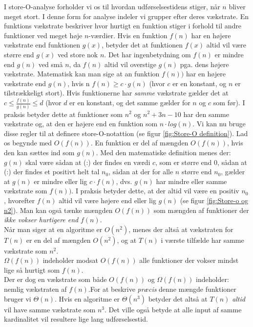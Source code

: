I store-O-analyse forholder vi os til hvordan udførselsestidens stiger, når $n$ bliver meget stort. I denne form for analyse indeler vi grupper efter deres vækstrate. En funktions vækstrate beskriver hvor hurtigt en funktion stiger i forhold til andre funktioner ved meget høje $n$-værdier. Hvis en funktion $f(n)$ har en højere vækstrate end funktionen $g(x)$, betyder det at funktionen $f(x)$ altid vil være større end $g(x)$ ved store nok $n$. Det har ingenbetydning om $f(n)$ er mindre end $g(n)$ ved små $n$, da $f(n)$ altid vil overstige $g(n)$ pga. dens højere vækstrate. Matematisk kan man sige at an funktion $f(n))$ har en højere vækstrate end $g(n)$, hvis n $f(n) \geq c \cdot g(n)$  (hvor $c$ er en konstant, og $n$ er tilstrækkeligt stort). Hvis funktionerne har \emph{samme} vækstrate gælder det at $c \leq \frac{f(n)}{g(n)} \leq d$ (hvor $d$ er en konstant, og det samme gælder for $n$ og $c$ som før). I praksis betyder dette at funktioner som $n^2$ og $n^2+3n-10$ har den samme vækstrate og, at den er højere end en funktion som $n \cdot log(n)$. Vi kan nu bruge disse regler til at definere store-O-notattion (se figur \ref{fig:Store-O definition}). Lad os begynde med $O(f(n))$. En funktion er del af mængden $O(f(n))$, hvis den kan sættes ind som $g(n)$. Med den matematiske definition menes der: $g(n)$ skal være sådan at (:) der findes en værdi $c$, som er større end $0$, sådan at (:) der findes et positivt helt tal $n_0$, sådan at der for alle $n$ større end $n_0$, gælder at $g(n)$ er mindre eller lig $c \cdot f(n)$, dvs. $g(n)$ har mindre eller samme vækstrate som $f(n))$. I praksis betyder dette, at der altid vil være en positiv $n_0$, hvorefter $f(n)$ altid vil være højere end eller lig $g(n)$ (se figur \ref{fig:Store-o og n2}). Man kan også tænke mængden $O(f(n))$ som mængden af funktioner der \emph{ikke vokser hurtigere end} $f(n)$.\\

Når man siger at en algoritme er $O(n^2)$, menes der altså at vækstraten for $T(n)$ er en del af mængden $O(n^2)$, og at $T(n)$ i værste tilfælde har samme vækstrate som $n^2$.\\

$\Omega (f(n))$ indeholder modsat $O(f(n))$ alle funktioner der vokser mindst lige så hurtigt som $f(n)$.\\

Der er dog en vækstrate som både $O(f(n))$ og $\Omega (f(n))$ indeholder: nemlig vækstraten af $f(n)$.For at beskrive \emph{præcis} denne mængde funktioner bruger vi $\Theta (n)$. Hvis en algoritme er $\Theta (n^3)$ betyder det altså at $T(n)$ \emph{altid} vil have samme vækstrate som $n^3$. Det ville også betyde at alle input af samme kardinalitet vil resultere lige lang udførselsestid.


